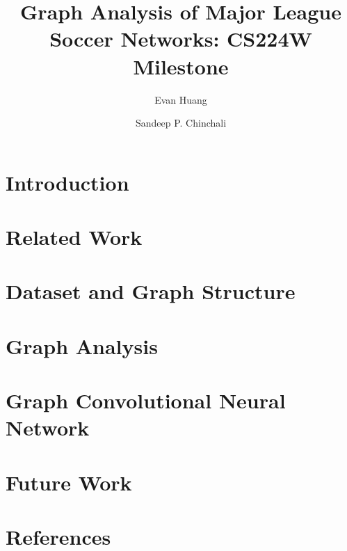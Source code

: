 \documentclass[newfonts=false,format=sigconf,10pt,letterpaper]{acmart}
\begin{document}

\title{Graph Analysis of Major League Soccer Networks: CS224W Milestone}

\author{Evan Huang}

\author{Sandeep P. Chinchali}

\maketitle

\section{Introduction}
\label{sec:introduction}


\section{Related Work}
\label{sec:related_work}


\section{Dataset and Graph Structure}
\label{sec:dataset}


\section{Graph Analysis}
\label{sec:graph_analysis}


\section{Graph Convolutional Neural Network}
\label{sec:graph_GCN}


\section{Future Work}
\label{sec:future_work}


\section{References}
\label{sec:ref}


% 
%
\end{document}
